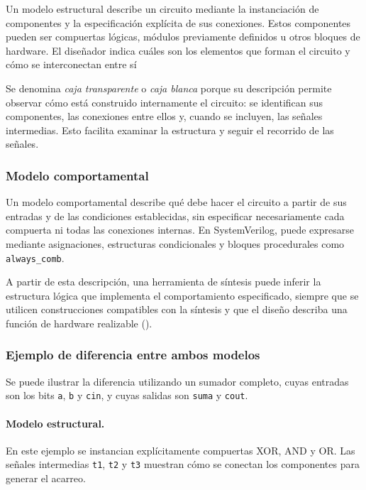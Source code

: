 \documentclass[12pt,letterpaper]{article}
\begin{document}
Un modelo estructural describe un circuito mediante la
instanciación de componentes y la especificación explícita de
sus conexiones. Estos componentes pueden ser compuertas lógicas,
módulos previamente definidos u otros bloques de hardware.
El diseñador indica cuáles son los elementos que forman el
circuito y cómo se interconectan entre sí
\cite{amd2026synthesis}

Se denomina \textit{caja transparente} o \textit{caja blanca}
porque su descripción permite observar cómo está construido
internamente el circuito: se identifican sus componentes,
las conexiones entre ellos y, cuando se incluyen, las señales
intermedias. Esto facilita examinar la estructura y seguir el
recorrido de las señales.

\subsubsection{Modelo comportamental}

Un modelo comportamental describe qué debe hacer el circuito
a partir de sus entradas y de las condiciones establecidas,
sin especificar necesariamente cada compuerta ni todas las
conexiones internas. En SystemVerilog, puede expresarse mediante
asignaciones, estructuras condicionales y bloques procedurales
como \texttt{always\_comb}.

A partir de esta descripción, una herramienta de síntesis puede
inferir la estructura lógica que implementa el comportamiento
especificado, siempre que se utilicen construcciones compatibles
con la síntesis y que el diseño describa una función de hardware
realizable (\parencite{amd2026synthesis}).

\subsubsection{Ejemplo de diferencia entre ambos modelos}

Se puede ilustrar la diferencia utilizando un sumador completo,
cuyas entradas son los bits \texttt{a}, \texttt{b} y
\texttt{cin}, y cuyas salidas son \texttt{suma} y \texttt{cout}.

\paragraph{Modelo estructural.}

En este ejemplo se instancian explícitamente compuertas XOR,
AND y OR. Las señales intermedias \texttt{t1}, \texttt{t2} y
\texttt{t3} muestran cómo se conectan los componentes para
generar el acarreo.
\end{document}
